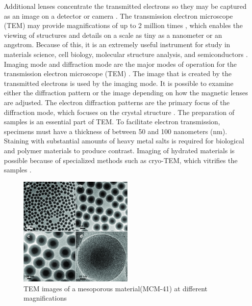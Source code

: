 Additional lenses concentrate the transmitted electrons so they may be captured as an image on a detector or camera \cite{Gault2008}. The transmission electron microscope (TEM) may provide magnifications of up to 2 million times \cite{Gault2008}, which enables the viewing of structures and details on a scale as tiny as a nanometer or an angstrom. Because of this, it is an extremely useful instrument for study in materials science, cell biology, molecular structure analysis, and semiconductors \cite{Gault2008}. Imaging mode and diffraction mode are the major modes of operation for the transmission electron microscope (TEM) \cite{Adrian1984}. The image that is created by the transmitted electrons is used by the imaging mode. It is possible to examine either the diffraction pattern or the image depending on how the magnetic lenses are adjusted. The electron diffraction patterns are the primary focus of the diffraction mode, which focuses on the crystal structure \cite{Adrian1984}. The preparation of samples is an essential part of TEM. To facilitate electron transmission, specimens must have a thickness of between 50 and 100 nanometers (nm)\cite{Adrian1984}. Staining with substantial amounts of heavy metal salts is required for biological and polymer materials to produce contrast. Imaging of hydrated materials is possible because of specialized methods such as cryo-TEM, which vitrifies the samples \cite{Adrian1984}.

\vspace{10pt}

\begin{figure}[thbp]
    \centering
    \includegraphics[width=0.5\textwidth]{img/TEM_MCM-41.png}
    \caption{TEM images of a mesoporous material(MCM-41) at different magnifications \cite{Loiseau2019}}\label{fig:TEM images of a mesoporous material}
\end{figure}


